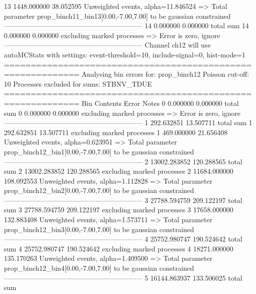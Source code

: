 13         1448.000000     38.052595       Unweighted events, alpha=11.846524
  => Total parameter prop_binch11_bin13[0.00,-7.00,7.00] to be gaussian constrained
------------------------------------------------------------
14         0.000000        0.000000        total sum                     
14         0.000000        0.000000        excluding marked processes    
  => Error is zero, ignore      
------------------------------------------------------------
Channel ch12 will use autoMCStats with settings: event-threshold=10, include-signal=0, hist-mode=1
============================================================
Analysing bin errors for: prop_binch12
Poisson cut-off: 10
Processes excluded for sums: STBNV_TDUE
============================================================
Bin        Contents        Error           Notes                         
0          0.000000        0.000000        total sum                     
0          0.000000        0.000000        excluding marked processes    
  => Error is zero, ignore      
------------------------------------------------------------
1          292.632851      13.507711       total sum                     
1          292.632851      13.507711       excluding marked processes    
1          469.000000      21.656408       Unweighted events, alpha=0.623951
  => Total parameter prop_binch12_bin1[0.00,-7.00,7.00] to be gaussian constrained
------------------------------------------------------------
2          13002.283852    120.288565      total sum                     
2          13002.283852    120.288565      excluding marked processes    
2          11684.000000    108.092553      Unweighted events, alpha=1.112828
  => Total parameter prop_binch12_bin2[0.00,-7.00,7.00] to be gaussian constrained
------------------------------------------------------------
3          27788.594759    209.122197      total sum                     
3          27788.594759    209.122197      excluding marked processes    
3          17658.000000    132.883408      Unweighted events, alpha=1.573711
  => Total parameter prop_binch12_bin3[0.00,-7.00,7.00] to be gaussian constrained
------------------------------------------------------------
4          25752.980747    190.524642      total sum                     
4          25752.980747    190.524642      excluding marked processes    
4          18271.000000    135.170263      Unweighted events, alpha=1.409500
  => Total parameter prop_binch12_bin4[0.00,-7.00,7.00] to be gaussian constrained
------------------------------------------------------------
5          16144.863937    133.506025      total sum                     
